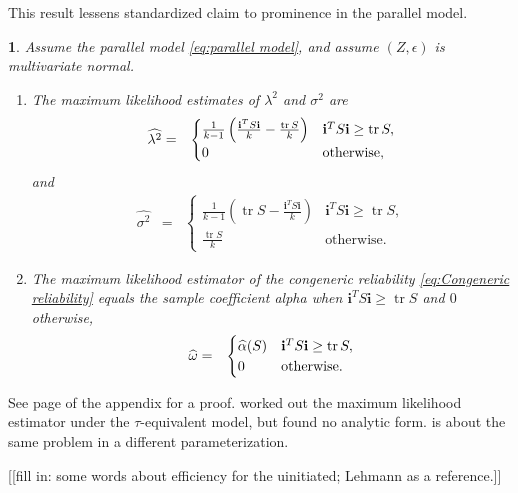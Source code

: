 \documentclass{article}
\makeatletter
\theoremstyle{plain}
\newtheorem{thm}{\protect\theoremname}
\theoremstyle{plain}
\theoremstyle{definition}
\theoremstyle{remark}
\theoremstyle{definition}
\theoremstyle{plain}
\theoremstyle{plain}
\theoremstyle{definition}
\newenvironment{proof}[1][\protect\proofname]{\par
	\normalfont\topsep6\p@\@plus6\p@\relax
	\trivlist
	\itemindent\parindent
	\item[\hskip\labelsep\scshape #1]\ignorespaces
}{%
	\endtrivlist\@endpefalse
}
\providecommand{\proofname}{Proof}
\providecommand{\theoremname}{Theorem}
\DeclareMathOperator{\tr}{tr}
\makeatother
\begin{document}
This result lessens standardized claim to prominence in the parallel model.

\begin{thm}\label{thm:ML}
Assume the parallel model \eqref{eq:parallel model}, and assume $(Z,\epsilon)$ is multivariate normal. 
\begin{enumerate}[label=(\roman*)]
\item The maximum likelihood estimates of $\lambda^{2}$
and $\sigma^{2}$ are 
\begin{eqnarray*}
\widehat{\lambda^{2}} & = & \begin{cases}
\frac{1}{k-1}\left(\frac{\mathbf{i}^{T}S\mathbf{i}}{k}-\frac{\tr{S}}{k}\right) & \mathbf{i}^{T}S\mathbf{i}\geq\tr{S},\\
0 & \text{\textrm{otherwise}},
\end{cases}\\
\end{eqnarray*}
and
\begin{eqnarray*}
\widehat{\sigma^{2}} & = & \begin{cases}
\frac{1}{k-1}\left(\tr{S}-\frac{\mathbf{i}^{T}S\mathbf{i}}{k}\right) & \mathbf{i}^{T}S\mathbf{i}\geq\tr{S},\\
\frac{\tr{S}}{k} & \textrm{otherwise}.
\end{cases}
\end{eqnarray*}
\item The maximum likelihood estimator of the congeneric reliability
\eqref{eq:Congeneric reliability} equals the sample coefficient alpha
when $\mathbf{i}^{T}S\mathbf{i}\geq\tr{S}$ and $0$ otherwise,
\begin{eqnarray*}
\widehat{\omega} & = & \begin{cases}
\widehat{\alpha}(S) & \mathbf{i}^{T}S\mathbf{i}\geq\tr{S},\\
0 & \text{\textrm{otherwise}}.
\end{cases}
\end{eqnarray*}
\end{enumerate}
\end{thm}
\begin{proof}
See page \pageref{proof:ML} of the appendix for a proof. \citet[][section 3 -- 5]{Kristof1969-ou} worked out the maximum likelihood estimator under the $\tau$-equivalent model, but found no analytic form. \citep[][Exercise 3.9, p. 114]{Muirhead2009-kq} is about the same problem in a different parameterization.
\end{proof}

[[fill in: some words about efficiency for the uinitiated; Lehmann as a reference.]]
\end{document}
